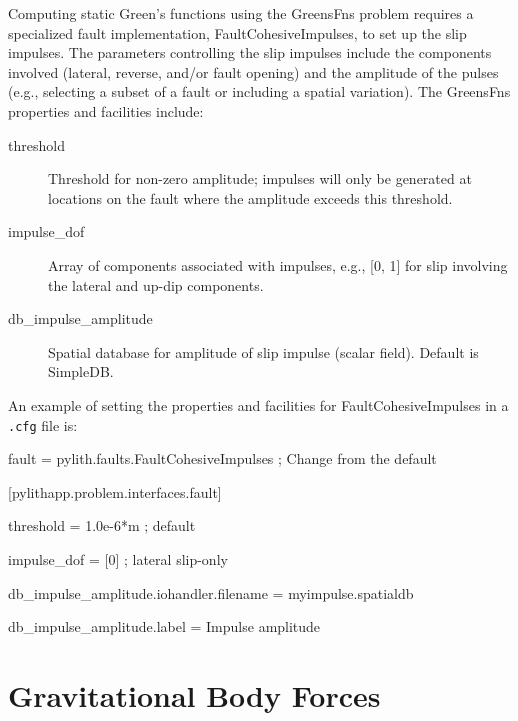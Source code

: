 Computing static Green's functions using the GreensFns problem requires
a specialized fault implementation, FaultCohesiveImpulses, to set
up the slip impulses. The parameters controlling the slip impulses
include the components involved (lateral, reverse, and/or fault opening)
and the amplitude of the pulses (e.g., selecting a subset of a fault
or including a spatial variation). The GreensFns properties and facilities
include:
\begin{description}
\item [{threshold}] Threshold for non-zero amplitude; impulses will only
be generated at locations on the fault where the amplitude exceeds
this threshold.
\item [{impulse\_dof}] Array of components associated with impulses, e.g.,
[0, 1] for slip involving the lateral and up-dip components.
\item [{db\_impulse\_amplitude}] Spatial database for amplitude of slip
impulse (scalar field). Default is SimpleDB.
\end{description}
An example of setting the properties and facilities for FaultCohesiveImpulses
in a \texttt{.cfg} file is:
\begin{lyxcode}

fault = pylith.faults.FaultCohesiveImpulses ; Change from the default 

[pylithapp.problem.interfaces.fault]

threshold = 1.0e-6{*}m ; default

impulse\_dof = [0] ; lateral slip-only

db\_impulse\_amplitude.iohandler.filename = myimpulse.spatialdb

db\_impulse\_amplitude.label = Impulse amplitude
\end{lyxcode}

\section{Gravitational Body Forces}

